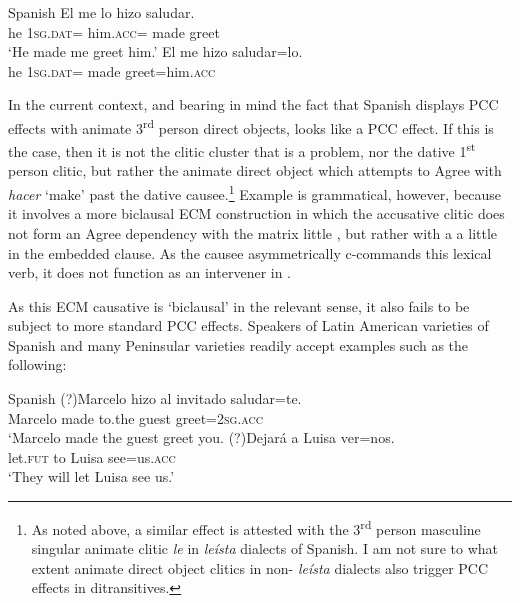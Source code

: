\documentclass[output=paper,colorlinks,citecolor=brown,nonflat]{langsci/langscibook}
\begin{document}
\ea%
    \label{ex:sheehan:33}
    Spanish \citep[463]{Torrego2010}
    \ea\label{ex:sheehan:33a}
    \gll    *El   me     lo     hizo   saludar.\\
            he   \textsc{1sg}.\textsc{dat}=  him.\textsc{acc}=  made greet\\
    \glt    ‘He made me greet him.’
    \ex\label{ex:sheehan:33b}
    \gll    El   me     hizo   saludar=lo.\\
            he   \textsc{1sg}.\textsc{dat=}  made   greet=him.\textsc{acc}\\
    \z
\z

In the current context, and bearing in mind the fact that Spanish displays PCC effects with animate 3\textsuperscript{rd} person direct objects,  looks like a PCC effect. If this is the case, then it is not the clitic cluster that is a problem, nor the dative 1\textsuperscript{st} person clitic, but rather the animate direct object which attempts to Agree with \textit{hacer} ‘make’ past the dative causee.\footnote{As noted above, a similar effect is attested with the 3\textsuperscript{rd} person masculine singular animate clitic \textit{le} in \textit{leísta} dialects of Spanish. I am not sure to what extent animate direct object clitics in non- \textit{leísta} dialects also trigger PCC effects in ditransitives.  } Example  is grammatical, however, because it involves a more biclausal ECM construction in which the accusative clitic does not form an Agree dependency with the matrix little \liv , but rather with a a little \liv in the embedded clause. As the causee asymmetrically c-commands this lexical verb, it does not function as an intervener in .

As this ECM causative is ‘biclausal’ in the relevant sense, it also fails to be subject to more standard PCC effects. Speakers of Latin American varieties of Spanish and many Peninsular varieties readily accept examples such as the following:

\ea%
    \label{ex:sheehan:34}
    Spanish
    \ea\label{ex:sheehan:34a}
    \gll    (?)Marcelo   hizo   al   invitado  saludar=te.\\
            Marcelo   made  to.the guest greet=\textsc{2sg}.\textsc{acc}\\
    \glt    `Marcelo made the guest greet you.
    \ex\label{ex:sheehan:34b}
    \gll    (?)Dejará   a   Luisa   ver=nos.\\
            let.\textsc{fut}   to   Luisa   see=us.\textsc{acc}\\
    \glt    ‘They will let Luisa see us.’
    \z
\z
\end{document}
